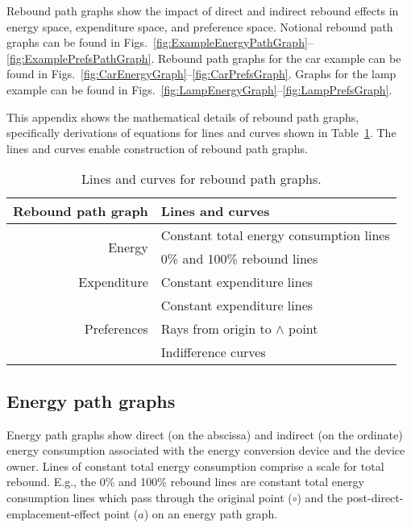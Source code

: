 
Rebound path graphs show the impact of direct and indirect rebound effects
in energy space, expenditure space, and preference space.
Notional rebound path graphs can be found in 
Figs.~\ref{fig:ExampleEnergyPathGraph}--\ref{fig:ExamplePrefsPathGraph}.
Rebound path graphs for the car example can be found in 
Figs.~\ref{fig:CarEnergyGraph}--\ref{fig:CarPrefsGraph}.
Graphs for the lamp example can be found in
Figs.~\ref{fig:LampEnergyGraph}--\ref{fig:LampPrefsGraph}.

This appendix shows the mathematical details of rebound path graphs,
specifically derivations of equations for lines and curves 
shown in Table~\ref{tab:lines_and_curves}.
The lines and curves enable construction of
rebound path graphs.

\begin{table}
\centering
\caption{Lines and curves for rebound path graphs.}
\label{tab:lines_and_curves}
\begin{tabular}{rl}
\toprule
Rebound path graph           & Lines and curves                        \\ 
\midrule
\multirow{2}{*}{Energy}      & Constant total energy consumption lines \\
                             & 0\% and 100\% rebound lines             \\
\midrule
Expenditure                  & Constant expenditure lines              \\
\midrule
\multirow{3}{*}{Preferences} & Constant expenditure lines              \\
                             & Rays from origin to $\wedge$ point      \\
                             & Indifference curves                     \\
\bottomrule
\end{tabular}
\end{table}


\subsection{Energy path graphs}
\label{sec:energy_path_graph_details}

Energy path graphs show direct (on the abscissa) and indirect (on the ordinate)
energy consumption associated with the energy conversion device 
and the device owner.
Lines of constant total energy consumption comprise a 
scale for total rebound.
E.g., the 0\% and 100\% rebound lines are constant total energy consumption
lines which pass through the original point ($\circ$) and
the post-direct-emplacement-effect point ($a$) 
on an energy path graph.

